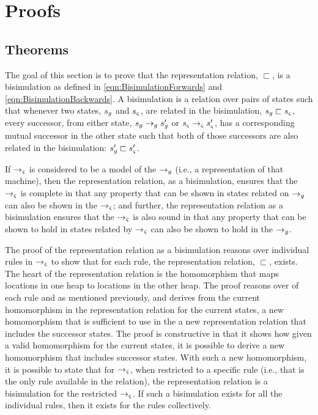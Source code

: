 \section{Proofs}




\subsection{Theorems}

The goal of this section is to prove that the representation relation,
$\sqsubset$, is a bisimulation as defined in
\eqref{eqn:BisimulationForwards} and
\eqref{eqn:BisimulationBackwards}.  A bisimulation is a relation over pairs of states such that whenever two states, $s_{g}$ and
$s_{\varsigma}$, are related in the bisimulation, $s_{g} \sqsubset
s_{\varsigma}$, every successor, from either state, $s_{g}
\rightarrow_{g} s_{g}^\prime$ or $s_{\varsigma} \rightarrow_{\varsigma}
s_{\varsigma}^\prime$, has a corresponding mutual successor in the other
state such that both of those successors are also related in the
bisimulation: $s_{g}^\prime \sqsubset s_{\varsigma}^\prime$.

If $\rightarrow_{\varsigma}$ is considered to be a model of the
$\rightarrow_{g}$ (i.e., a representation of that machine), then the
representation relation, as a bisimulation, ensures that the
$\rightarrow_{\varsigma}$ is complete in that any property that can be
shown in states related on $\rightarrow_{g}$ can also be shown in the
$\rightarrow_{\varsigma}$; and further, the representation relation as a
bisimulation ensures that the $\rightarrow_{\varsigma}$ is also sound in
that any property that can be shown to hold in states related by $\rightarrow_{\varsigma}$
can also be shown to hold in the $\rightarrow_{g}$.

The proof of the representation relation as a bisimulation reasons
over individual rules in $\rightarrow_{\varsigma}$ to show that for
each rule, the representation relation, $\sqsubset$, exists. The heart
of the representation relation is the homomorphism that maps locations
in one heap to locations in the other heap. The proof reasons over of
each rule and as mentioned previously, and derives from the current
homomorphism in the representation relation for the current states, a
new homomorphism that is sufficient to use in the a new representation
relation that includes the successor states. The proof is constructive
in that it shows how given a valid homomorphism for the current
states, it is possible to derive a new homomorphism that includes
successor states. With such a new homomorphism, it is possible to
state that for $\rightarrow_{\varsigma}$, when restricted to a specific
rule (i.e., that is the only rule available in the relation), the
representation relation is a bisimulation for the restricted
$\rightarrow_{\varsigma}$. If such a bisimulation exists for all the
individual rules, then it exists for the rules collectively.

